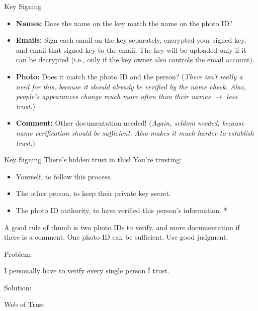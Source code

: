 \documentclass{beamer}
\begin{document}
\begin{frame}{Key Signing}
  \begin{itemize}
  \item\textbf{Names:} Does the name on the key match the name on the
    photo ID?
    \pause
  \item\textbf{Emails:} Sign each email on the key separately,
    encrypted your signed key, and email that signed key to the
    email.  The key will be uploaded only if it can be decrypted
    (i.e., only if the key owner also controls the email account).
    \pause
  \item\textbf{Photo:} Does it match the photo ID and the person?
    (\textit{There isn't really a need for this, because it should
      already be verified by the name check.  Also, people's
      appearances change much more often than their names
      $\rightarrow$ less trust.})
    \pause
  \item\textbf{Comment:} Other documentation needed! (\textit{Again,
      seldom needed, because name verification should be sufficient.
      Also makes it much harder to establish trust.})
  \end{itemize}
\end{frame}

\begin{frame}{Key Signing}
  There's hidden trust in this!  You're trusting:
  \begin{itemize}
  \item Yourself, to follow this process.
    \pause
  \item The other person, to keep their private key secret.
    \pause
  \item The photo ID authority, to have verified this person's
    information. *
  \end{itemize}
  \pause

  A good rule of thumb is two photo IDs to verify, and more
  documentation if there is a comment.  One photo ID can be
  sufficient.  Use good judgment.
\end{frame}

\begin{frame}{}
  Problem:

  \begin{center}
    \Large I personally have to verify every single person I trust.
  \end{center}
\end{frame}

\begin{frame}{}
  Solution:

  \begin{center}
    \Huge Web of Trust
  \end{center}
\end{frame}
\end{document}
